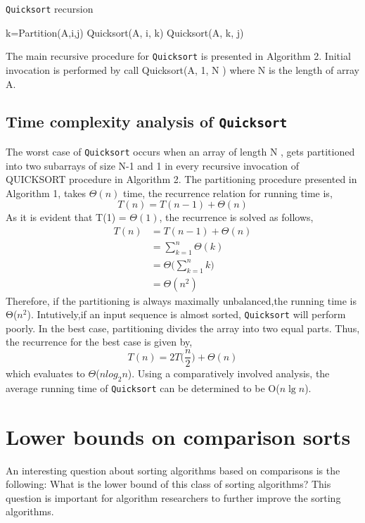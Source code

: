 \documentclass[a4paper, 10pt,twocolumn]{article}
\begin{document}
\begin{algorithm}
  \caption{\texttt{Quicksort} recursion}
  \begin{algorithmic}[1]
    \newline
      \State k=Partition(A,i,j)
      \State Quicksort(A, i, k)
      \State Quicksort(A, k, j)
    \EndIf
    \EndProcedure
  \end{algorithmic}
\end{algorithm}
The main recursive procedure for \texttt{Quicksort} is presented in Algorithm 2. Initial invocation is performed by call Quicksort(A, 1, N ) where N is the length of array A.
\subsection{Time complexity analysis of \texttt{Quicksort}}
The worst case of \texttt{Quicksort} occurs when an array of length N , gets partitioned into two subarrays of size N-1 and 1 in every recursive invocation of QUICKSORT procedure in Algorithm 2. The partitioning procedure presented in Algorithm 1, takes $\Theta(n)$ time, the recurrence relation for running time is,
$$T(n)=T(n-1)+\Theta(n)$$
As it is evident that T(1) = $\Theta(1)$, the recurrence is solved as follows,
\begin{align*}
  T(n)&=T(n-1)+\Theta(n)\\
  &=\sum_{k=1}^{n}\Theta(k)\\
  &=\Theta \Big(\sum_{k=1}^{n}k \Big)\\
  &=\Theta(n^2)
\end{align*}
Therefore, if the partitioning is always maximally unbalanced,the running time is Θ($n^2$). Intutively,if an input sequence is almost sorted, \texttt{Quicksort} will perform poorly. In the best case, partitioning divides the array into two equal parts. Thus, the recurrence for the best case is given by,
$$T(n)=2T \Big(\frac{n}{2} \Big)+\Theta(n)$$
which evaluates to $\Theta$($nlog_2 n$). Using a comparatively involved analysis, the average running time of \texttt{Quicksort} can be determined to be O($n\lg n$).
\section{Lower bounds on comparison sorts}
An interesting question about sorting algorithms based on comparisons is the following: What is the lower bound of this class of sorting algorithms? This question is important for algorithm researchers to further improve the sorting algorithms.
\end{document}
